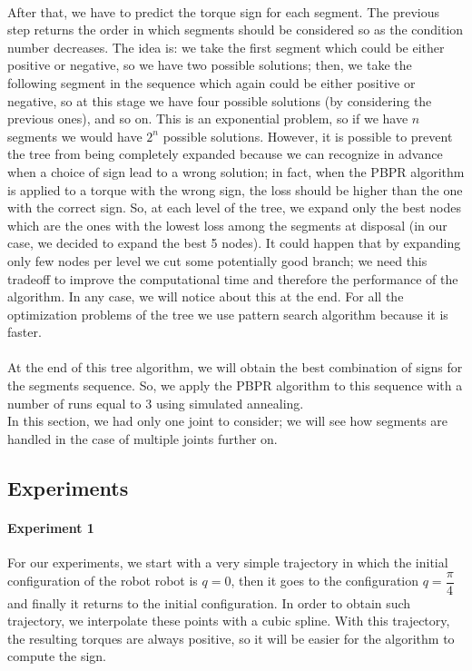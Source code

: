 \documentclass{article}
\begin{document}
\paragraph{}After that, we have to predict the torque sign for each segment. The previous step returns the order in which segments should be considered so as the condition number decreases. The idea is: we take the first segment which could be either positive or negative, so we have two possible solutions; then, we take the following segment in the sequence which again could be either positive or negative, so at this stage we have four possible solutions (by considering the previous ones), and so on. This is an exponential problem, so if we have $n$ segments we would have $2^n$ possible solutions. However, it is possible to prevent the tree from being completely expanded because we can recognize in advance when a choice of sign lead to a wrong solution; in fact, when the PBPR algorithm is applied to a torque with the wrong sign, the loss should be higher than the one with the correct sign. So, at each level of the tree, we expand only the best nodes which are the ones with the lowest loss among the segments at disposal (in our case, we decided to expand the best 5 nodes).  It could happen that by expanding only few nodes per level we cut some potentially good branch; we need this tradeoff to improve the computational time and therefore the performance of the algorithm. In any case, we will notice about this at the end. For all the optimization problems of the tree we use pattern search algorithm because it is faster.

\paragraph{}At the end of this tree algorithm, we will obtain the best combination of signs for the segments sequence. So, we apply the PBPR algorithm to this sequence with a number of runs equal to 3 using simulated annealing.\\

In this section, we had only one joint to consider; we will see how segments are handled in the case of multiple joints further on.

\subsection{Experiments}
\paragraph{Experiment 1}
For our experiments, we start with a very simple trajectory in which the initial configuration of the robot robot is $q = 0$, then it goes to the configuration $q = \dfrac{\pi}{4}$ and finally it returns to the initial configuration. In order to obtain such trajectory, we interpolate these points with a cubic spline. With this trajectory, the resulting torques are always positive, so it will be easier for the algorithm to compute the sign.
\end{document}
